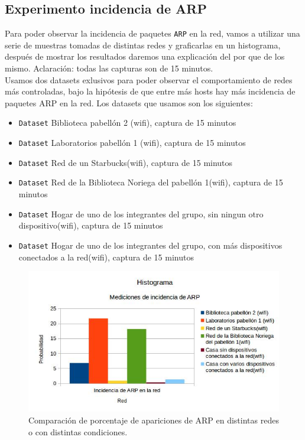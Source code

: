 
\subsection{Experimento incidencia de ARP}

Para poder observar la incidencia de paquetes \texttt{ARP} en la red, vamos a utilizar una serie de muestras tomadas de distintas redes y graficarlas en un histograma, 
después de mostrar los resultados daremos una explicación del por que de los mismo. Aclaración: todas las capturas son de 15 minutos.\\

Usamos dos datasets exlusivos para poder observar el comportamiento de redes más controladas, bajo la hipótesis de que entre más hosts hay más incidencia de paquetes ARP 
en la red. Los datasets que usamos son los siguientes:\\

\begin{itemize}
    \item \texttt{Dataset} Biblioteca pabellón 2 (wifi), captura de 15 minutos
    \item \texttt{Dataset} Laboratorios pabellón 1 (wifi), captura de 15 minutos
    \item \texttt{Dataset} Red de un Starbucks(wifi), captura de 15 minutos
    \item \texttt{Dataset} Red de la Biblioteca Noriega del pabellón 1(wifi), captura de 15 minutos
    \item \texttt{Dataset} Hogar de uno de los integrantes del grupo, sin ningun otro dispositivo(wifi), captura de 15 minutos
    \item \texttt{Dataset} Hogar de uno de los integrantes del grupo, con más dispositivos conectados a la red(wifi), captura de 15 minutos
\end{itemize}

\begin{figure}[H]
\centering
\includegraphics[width=150mm]{imagenes/IncidenciaARP.jpg}
\caption{Comparación de porcentaje de apariciones de ARP en distintas redes o con distintas condiciones.\label{overflow}}
\end{figure}

